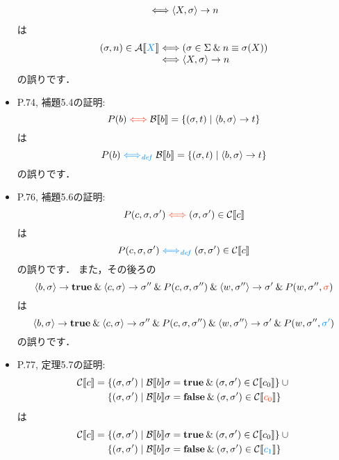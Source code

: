 \documentclass[12pt,titlepage,twoside,openright,dvipdfmx]{jsbook}
\newcommand\old[1]{%
  \textcolor[rgb]{1.0,0.25,0.1}{#1}%
  }
\newcommand\new[1]{%
  \textcolor[rgb]{0,0.55,1.0}{#1}%
  }
\theoremstyle{definition}
\begin{document}
\begin{itemize}
\[\begin{array}{l@{}l}
      & {} \Longleftrightarrow \tuple{X,\sigma}\rightarrow n
    \end{array}
  \]
  は
  \[
    \begin{array}{l@{}l}
      (\sigma, n)\in\denotation{A}{\new{X}}
      & {} \Longleftrightarrow (\sigma\in\Sigma\AND n\equiv \sigma(X)) \\
      & {} \Longleftrightarrow \tuple{X,\sigma}\rightarrow n
    \end{array}
  \]
  の誤りです．
\item P.74, 補題5.4の証明:
    \[
      P(b)\old{{}\Longleftrightarrow{}}
      \denotation{B}{b}=\{ (\sigma,t) \mid   \tuple{b,\sigma}\rightarrow t\}
    \]
    は
    \[
      P(b)\new{{}\Longleftrightarrow_{\mathit{def}}{}}
      \denotation{B}{b}=\{ (\sigma,t) \mid   \tuple{b,\sigma}\rightarrow t\}
    \]
    の誤りです．
  \item P.76, 補題5.6の証明:
    \[
      P(c,\sigma,\sigma')
      \old{{}\Longleftrightarrow{}}
      (\sigma,\sigma')\in\denotation{C}{c}
    \]
    は
    \[
      P(c,\sigma,\sigma')
      \new{{}\Longleftrightarrow_{\mathit{def}}{}}
      (\sigma,\sigma')\in\denotation{C}{c}
    \]
    の誤りです．
    また，その後ろの
    \[
      \tuple{b,\sigma}\rightarrow\mathbf{true}\AND
      \tuple{c,\sigma}\rightarrow\sigma''\AND
      P(c,\sigma,\sigma'') \AND
      \tuple{w,\sigma''}\rightarrow\sigma'\AND
      P(w,\sigma'',\old{\sigma})
    \]
    は
    \[
      \tuple{b,\sigma}\rightarrow\mathbf{true}\AND
      \tuple{c,\sigma}\rightarrow\sigma''\AND
      P(c,\sigma,\sigma'') \AND
      \tuple{w,\sigma''}\rightarrow\sigma'\AND
      P(w,\sigma'',\new{\sigma'})
    \]
    の誤りです．
  \item P.77, 定理5.7の証明:
    \begin{align*}
      \denotation{C}{c} = {}
      & \{(\sigma,\sigma')\mid  \denotation{B}{b}\sigma=\mathbf{true}\AND
        (\sigma,\sigma')\in\denotation{C}{c_0}\}\cup {} \\
      & \{(\sigma,\sigma')\mid  \denotation{B}{b}\sigma=\mathbf{false}\AND
        (\sigma,\sigma')\in\denotation{C}{\old{c_0}}\}  
    \end{align*}
    は
    \begin{align*}
      \denotation{C}{c} = {}
      & \{(\sigma,\sigma')\mid  \denotation{B}{b}\sigma=\mathbf{true}\AND
        (\sigma,\sigma')\in\denotation{C}{c_0}\}\cup {} \\
      & \{(\sigma,\sigma')\mid  \denotation{B}{b}\sigma=\mathbf{false}\AND
        (\sigma,\sigma')\in\denotation{C}{\new{c_1}}\}  

\end{align*}
\end{itemize}
\end{document}
